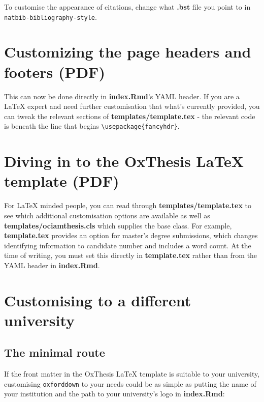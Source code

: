 \documentclass[a4paper, nobind]{templates/ociamthesis}
\begin{document}
To customise the appearance of citations, change what \textbf{.bst} file you point to in \texttt{natbib-bibliography-style}.

\hypertarget{customizing-the-page-headers-and-footers-pdf}{%
\section{Customizing the page headers and footers (PDF)}\label{customizing-the-page-headers-and-footers-pdf}}

This can now be done directly in \textbf{index.Rmd}'s YAML header.
If you are a LaTeX expert and need further customisation that what's currently provided, you can tweak the relevant sections of \textbf{templates/template.tex} - the relevant code is beneath the line that begins \texttt{\textbackslash{}usepackage\{fancyhdr\}}.

\hypertarget{diving-in-to-the-oxthesis-latex-template-pdf}{%
\section{Diving in to the OxThesis LaTeX template (PDF)}\label{diving-in-to-the-oxthesis-latex-template-pdf}}

For LaTeX minded people, you can read through \textbf{templates/template.tex} to see which additional customisation options are available as well as \textbf{templates/ociamthesis.cls} which supplies the base class.
For example, \textbf{template.tex} provides an option for master's degree submissions, which changes identifying information to candidate number and includes a word count.
At the time of writing, you must set this directly in \textbf{template.tex} rather than from the YAML header in \textbf{index.Rmd}.

\hypertarget{customising-to-a-different-university}{%
\section{Customising to a different university}\label{customising-to-a-different-university}}

\hypertarget{the-minimal-route}{%
\subsection{The minimal route}\label{the-minimal-route}}

If the front matter in the OxThesis LaTeX template is suitable to your university, customising \texttt{oxforddown} to your needs could be as simple as putting the name of your institution and the path to your university's logo in \textbf{index.Rmd}:
\end{document}
